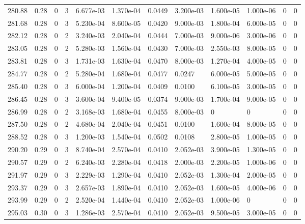 \documentclass[preview]{standalone}
\begin{document}
{{{{{{{{{{{\begin{tabular}{L{1.2cm}C{1.2cm} C{0.3cm}C{0.5cm} C{1.4cm}C{1.4cm} C{1.4cm}C{1.4cm} C{1.6cm}C{1.6cm} C{1.6cm}C{1.6cm}}
  280.88  &  0.28  & 0     &  3 &  6.677e-03  & 1.370e-04  &  0.0449&   3.200e-03& 1.600e-05 & 1.000e-06   &  0 & 0  \\ 
  281.68  &  0.28  & 0     &  3 &  5.230e-04  & 8.600e-05  &  0.0420&   9.000e-03& 1.800e-04 & 6.000e-05   &  0 & 0  \\ 
  282.12  &  0.28  & 0     &  2 &  3.240e-03  & 2.040e-04  &  0.0444&   7.000e-03& 9.000e-06 & 3.000e-06   &  0 & 0  \\ 
  283.05  &  0.28  & 0     &  2 &  5.280e-03  & 1.560e-04  &  0.0430&   7.000e-03& 2.550e-03 & 8.000e-05   &  0 & 0  \\ 
  283.81  &  0.28  & 0     &  3 &  1.731e-03  & 1.630e-04  &  0.0470&   8.000e-03& 1.270e-04 & 4.000e-05   &  0 & 0  \\ 
  284.77  &  0.28  & 0     &  2 &  5.280e-04  & 1.680e-04  &  0.0477&   0.0247& 6.000e-05 & 5.000e-05   &  0 & 0  \\ 
  285.40  &  0.28  & 0     &  3 &  6.000e-04  & 1.200e-04  &  0.0409&   0.0100& 6.100e-05 & 3.000e-05   &  0 & 0  \\ 
  286.45  &  0.28  & 0     &  3 &  3.600e-04  & 9.400e-05  &  0.0374&   9.000e-03& 1.700e-04 & 9.000e-05   &  0 & 0  \\ 
  286.99  &  0.28  & 0     &  2 &  3.168e-03  & 1.680e-04  &  0.0455&   8.000e-03& 0 & 0   &  0 & 0  \\ 
  287.50  &  0.28  & 0     &  2 &  4.680e-04  & 2.040e-04  &  0.0451&   0.0100& 1.600e-04 & 8.000e-05   &  0 & 0  \\ 
  288.52  &  0.28  & 0     &  3 &  1.200e-03  & 1.540e-04  &  0.0502&   0.0108& 2.800e-05 & 1.000e-05   &  0 & 0  \\ 
  290.20  &  0.29  & 0     &  3 &  8.740e-04  & 2.570e-04  &  0.0410&   2.052e-03& 3.900e-05 & 1.300e-05   &  0 & 0  \\ 
  290.57  &  0.29  & 0     &  2 &  6.240e-03  & 2.280e-04  &  0.0418&   2.000e-03& 2.200e-05 & 1.000e-06   &  0 & 0  \\ 
  291.97  &  0.29  & 0     &  3 &  2.229e-03  & 1.290e-04  &  0.0410&   2.052e-03& 1.300e-04 & 2.000e-05   &  0 & 0  \\ 
  293.37  &  0.29  & 0     &  3 &  2.657e-03  & 1.890e-04  &  0.0410&   2.052e-03& 1.600e-05 & 4.000e-06   &  0 & 0  \\ 
  293.99  &  0.29  & 0     &  2 &  2.520e-04  & 1.440e-04  &  0.0410&   2.052e-03& 1.000e-06 & 0   &  0 & 0  \\ 
  295.03  &  0.30  & 0     &  3 &  1.286e-03  & 2.570e-04  &  0.0410&   2.052e-03& 9.500e-05 & 3.000e-05   &  0 & 0  \\ 

\end{tabular}}}}}}}}}}}}
\end{document}
